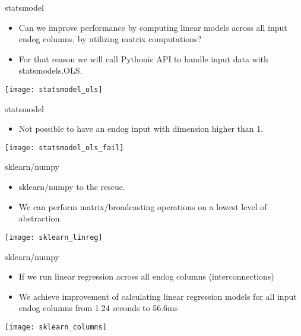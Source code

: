 \documentclass[english,aspectratio=169]{beamer}
\begin{document}
\begin{frame}{statsmodel}
    \begin{itemize}
        \item Can we improve performance by computing linear models across all input endog columns, by utilizing matrix computations?
        \item For that reason we will call Pythonic API to handle input data with statsmodels.OLS.
    \end{itemize}

    \begin{center}
        \texttt{[image: statsmodel\_ols]}
    \end{center}
\end{frame}

\begin{frame}{statsmodel}
    \begin{itemize}
        \item Not possible to have an endog input with dimension higher than 1.
    \end{itemize}

    \begin{center}
        \texttt{[image: statsmodel\_ols\_fail]}
    \end{center}
\end{frame}

\begin{frame}{sklearn/numpy}
    \begin{itemize}
        \item sklearn/numpy to the rescue.
        \item We can perform matrix/broadcasting operations on a lowest level of abstraction.
    \end{itemize}

    \begin{center}
        \texttt{[image: sklearn\_linreg]}
    \end{center}
\end{frame}

\begin{frame}{sklearn/numpy}
    \begin{itemize}
        \item If we run linear regression across all endog columns (interconnections)
        \item We achieve improvement of calculating linear regression models for all input endog columns from 1.24 seconds to 56.6ms
    \end{itemize}

    \begin{center}
        \texttt{[image: sklearn\_columns]}
    \end{center}
\end{frame}
\end{document}
